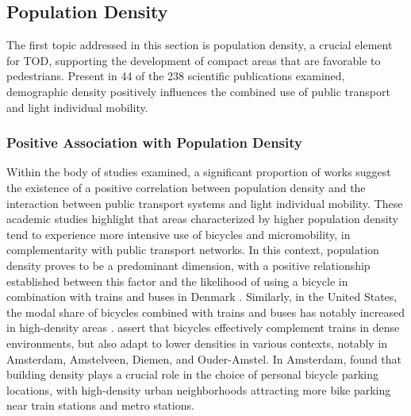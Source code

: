 \begin{refsegment}
\subsection{Population Density
    \label{chap2:densite-population}
    }

The first topic addressed in this section is population density, a crucial element for \acrshort{TOD}, supporting the development of compact areas that are favorable to pedestrians. Present in 44 of the 238 scientific publications examined, demographic density positively influences the combined use of public transport and light individual mobility.%

\subsubsection*{Positive Association with Population Density
    \label{chap2:association-positive-densite-population}
    }

Within the body of studies examined, a significant proportion of works suggest the existence of a positive correlation between population density and the interaction between public transport systems and light individual mobility. These academic studies highlight that areas characterized by higher population density tend to experience more intensive use of bicycles and micromobility, in complementarity with public transport networks. In this context, population density proves to be a predominant dimension, with a positive relationship established between this factor and the likelihood of using a bicycle in combination with trains and buses in Denmark \textcolor{blue}{\autocite[41]{nielsen_bikeability_2018}}. Similarly, in the United States, the modal share of bicycles combined with trains and buses has notably increased in high-density areas \textcolor{blue}{\autocite[107]{wang_bicycle-transit_2013}}. \textcolor{blue}{\textcite[212]{kager_characterisation_2016}} assert that bicycles effectively complement trains in dense environments, but also adapt to lower densities in various contexts, notably in Amsterdam, Amstelveen, Diemen, and Ouder-Amstel. In Amsterdam, \textcolor{blue}{\textcite[344]{kampen_bicycle_2021}} found that building density plays a crucial role in the choice of personal bicycle parking locations, with high-density urban neighborhoods attracting more bike parking near train stations and metro stations.%


\end{refsegment}
